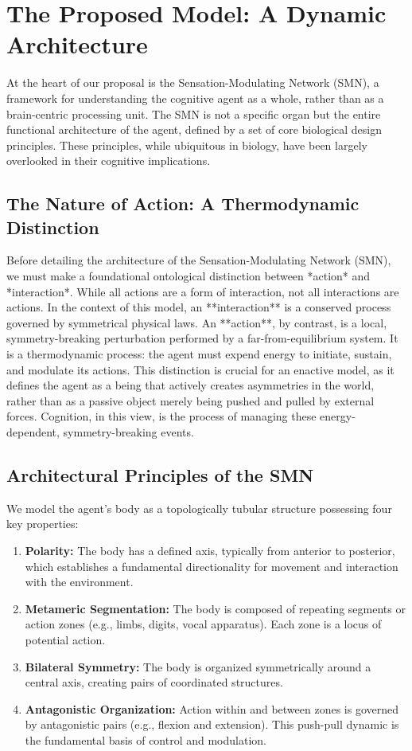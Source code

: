 \section{The Proposed Model: A Dynamic Architecture}
\label{sec:model}
At the heart of our proposal is the Sensation-Modulating Network (SMN), a framework for understanding the cognitive agent as a whole, rather than as a brain-centric processing unit. The SMN is not a specific organ but the entire functional architecture of the agent, defined by a set of core biological design principles. These principles, while ubiquitous in biology, have been largely overlooked in their cognitive implications.

\subsection{The Nature of Action: A Thermodynamic Distinction}
\label{subsec:action_nature}
Before detailing the architecture of the Sensation-Modulating Network (SMN), we must make a foundational ontological distinction between *action* and *interaction*. While all actions are a form of interaction, not all interactions are actions. In the context of this model, an **interaction** is a conserved process governed by symmetrical physical laws. An **action**, by contrast, is a local, symmetry-breaking perturbation performed by a far-from-equilibrium system. It is a thermodynamic process: the agent must expend energy to initiate, sustain, and modulate its actions. This distinction is crucial for an enactive model, as it defines the agent as a being that actively creates asymmetries in the world, rather than as a passive object merely being pushed and pulled by external forces. Cognition, in this view, is the process of managing these energy-dependent, symmetry-breaking events.

\subsection{Architectural Principles of the SMN}
\label{subsec:architectural_principles}
We model the agent's body as a topologically tubular structure possessing four key properties:
\begin{enumerate}
    \item \textbf{Polarity:} The body has a defined axis, typically from anterior to posterior, which establishes a fundamental directionality for movement and interaction with the environment.
    \item \textbf{Metameric Segmentation:} The body is composed of repeating segments or action zones (e.g., limbs, digits, vocal apparatus). Each zone is a locus of potential action.
    \item \textbf{Bilateral Symmetry:} The body is organized symmetrically around a central axis, creating pairs of coordinated structures.
    \item \textbf{Antagonistic Organization:} Action within and between zones is governed by antagonistic pairs (e.g., flexion and extension). This push-pull dynamic is the fundamental basis of control and modulation.
\end{enumerate}

